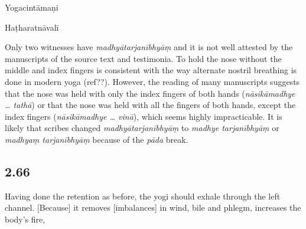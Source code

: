 \begin{ekdosis}
\begin{sources}[hp02_065]
\begin{versinnote}
\end{versinnote}
\end{sources}

\begin{testimonia}[hp02_065]
Yogacintāmaṇi

\begin{versinnote}
\end{versinnote}

Haṭharatnāvalī

\begin{versinnote}
\tl{dhārayen nāsikāṃ madhyātarjanībhyāṃ vinā dṛḍham |
\var{23c madhyā ] madhye vl}\\!}
\end{versinnote}
\end{testimonia}

\begin{philcomm}[hp02_065]
Only two witnesses have \emph{madhyātarjanībhyāṃ} and it is not well attested by the manuscripts of the source text and testimonia. To hold the nose without the middle and index fingers is consistent with the way alternate nostril breathing is done in modern yoga (ref??). However, the reading of many manuscripts suggests that the nose was held with only the index fingers of both hands (\emph{nāsikāmadhye … tathā}) or that the nose was held with all the fingers of both hands, except the index fingers (\emph{nāsikāmadhye … vinā}), which seems highly impracticable. It is likely that scribes changed \emph{madhyātarjanībhyāṃ} to \emph{madhye tarjanībhyāṃ} or \emph{madhyaṃ tarjanībhyāṃ} because of the \emph{pāda} break. 
\end{philcomm}

\subsection*{2.66}
\begin{translation}[hp02_066]
Having done the retention as before, the yogi should exhale through the left channel. [Because] it removes [imbalances] in wind, bile and phlegm, increases the body’s fire,


\end{translation}
\end{ekdosis}

